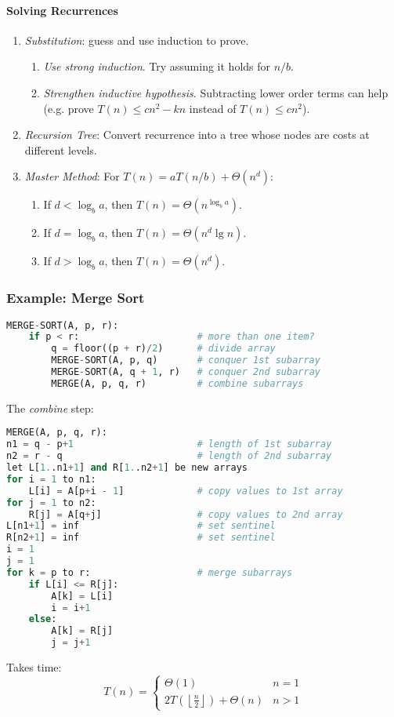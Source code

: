 \documentclass[twocolumn,english]{article}
\begin{document}
\paragraph{Solving Recurrences}
\begin{enumerate}
\item \emph{Substitution}: guess and use induction to prove.
\begin{enumerate}
\item \emph{Use strong induction}. Try assuming it holds for $n/b$.
\item \emph{Strengthen inductive hypothesis}. Subtracting lower order terms
can help (e.g. prove $T\left(n\right)\leq cn^{2}-kn$ instead of $T\left(n\right)\leq cn^{2}$).
\end{enumerate}
\item \emph{Recursion Tree}: Convert recurrence into a tree whose nodes
are costs at different levels.
\item \emph{Master Method}: For $T\left(n\right)=aT\left(n/b\right)+\Theta(n^{d})$:
\begin{enumerate}
\item If $d<\log_{b}a$, then $T\left(n\right)=\Theta\left(n^{\log_{b}a}\right)$.
\item If $d=\log_{b}a$, then $T\left(n\right)=\Theta\left(n^{d}\lg n\right)$.
\item If $d>\log_{b}a$, then $T\left(n\right)=\Theta\left(n^{d}\right)$.
\end{enumerate}
\end{enumerate}

\subsubsection*{Example: Merge Sort}

\begin{lstlisting}[language=Python,basicstyle={\footnotesize\ttfamily},tabsize=4,frame=single]
MERGE-SORT(A, p, r):
	if p < r:                     # more than one item?
		q = floor((p + r)/2)      # divide array
		MERGE-SORT(A, p, q)       # conquer 1st subarray
		MERGE-SORT(A, q + 1, r)   # conquer 2nd subarray
		MERGE(A, p, q, r)         # combine subarrays
\end{lstlisting}

The \emph{combine} step:

\begin{lstlisting}[language=Python,basicstyle={\footnotesize\ttfamily},tabsize=4,frame=single]
MERGE(A, p, q, r):
n1 = q - p+1                      # length of 1st subarray
n2 = r - q                        # length of 2nd subarray
let L[1..n1+1] and R[1..n2+1] be new arrays
for i = 1 to n1:
	L[i] = A[p+i - 1]             # copy values to 1st array
for j = 1 to n2:
	R[j] = A[q+j]                 # copy values to 2nd array
L[n1+1] = inf                     # set sentinel
R[n2+1] = inf                     # set sentinel
i = 1
j = 1
for k = p to r:                   # merge subarrays
	if L[i] <= R[j]:
		A[k] = L[i]
		i = i+1
	else:
		A[k] = R[j]
		j = j+1
\end{lstlisting}

Takes time:
\[
T\left(n\right)=\begin{cases}
\Theta\left(1\right) & n=1\\
2T\left(\left\lfloor \frac{n}{2}\right\rfloor \right)+\Theta\left(n\right) & n>1
\end{cases}
\]
\end{document}
